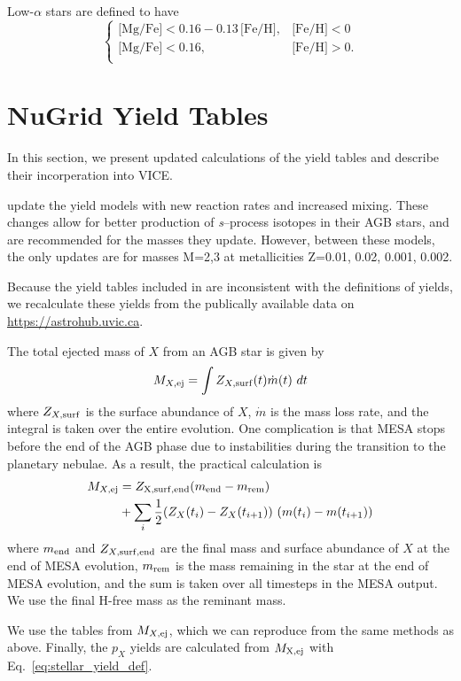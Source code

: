 \documentclass[fleqn,
usenatbib]{mnras}
\begin{document}
Low-$\alpha$ stars are defined to have 
\begin{equation}\label{eq:high_alpha}
\begin{cases}
\text{[Mg/Fe]} <0.16-0.13\,\text{[Fe/H]}, & \text{[Fe/H]}<0\\
\text{[Mg/Fe]} <0.16, & \text{[Fe/H]}>0. \\
\end{cases}
\end{equation}



\section{NuGrid Yield Tables} \label{sec:nugrid_yields}
In this section, we present updated calculations of the \citep{battino+19, battino+21} yield tables and describe their incorperation into VICE.

\citep{battino+19, battino+21} update the \citep{ritter+18} yield models with new reaction rates and increased mixing. These changes allow for better production of {\it s}--process isotopes in their AGB stars, and are recommended for the masses they update. However, between these models, the only updates are for masses M=2,3 at metallicities Z=0.01, 0.02, 0.001, 0.002. 

Because the yield tables included in \citep{battino+19, battino+21} are inconsistent with the \citet{ritter+18} definitions of yields, we recalculate these yields from the publically available data on \url{https://astrohub.uvic.ca}. 

The total ejected mass of $X$ from an AGB star is given by 
\begin{equation}
    M_{X, \rm ej} = \int Z_{X, \rm surf}(t) \dot{m}(t)\ dt 
\end{equation}
where $Z_{X, \rm surf}$ is the surface abundance of $X$, $\dot m$ is the mass loss rate, and the integral is taken over the entire evolution. 
One complication is that MESA stops before the end of the AGB phase due to instabilities during the transition to the planetary nebulae. 
As a result, the practical calculation is 
\begin{subequations}
    \begin{align}
        M_{X, \rm ej} &= Z_{\rm X, surf, end} (m_{\rm end} - m_{\rm rem}) \\ 
                      &+ \sum_i \frac{1}{2} (Z_X(t_i) - Z_X(t_{i+1}))\ (m(t_i) - m(t_{i+1}))
    \end{align}
\end{subequations}
where $m_{\rm end}$ and $Z_{X, \rm surf, end}$ are the final mass and surface abundance of $X$ at the end of MESA evolution, $m_{\rm rem}$ is the mass remaining in the star at the end of MESA evolution, and the sum is taken over all timesteps in the MESA output. We use the final H-free mass as the reminant mass. 

We use the \citet{ritter+18} tables from $M_{X, \rm ej}$, which we can reproduce from the same methods as above. Finally, the $p_{X}$ yields are calculated from $M_{\rm X, ej}$ with Eq.~\ref{eq:stellar_yield_def}. 

\bsp	%
\label{lastpage}
\end{document}

